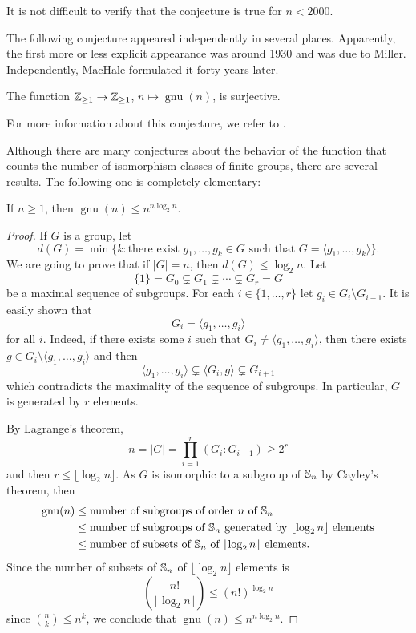 It is not difficult to verify that the conjecture is true for $n<2000$.

The following conjecture appeared independently in several places. Apparently, the first more or less explicit appearance was around 1930 and was due to Miller. Independently, MacHale formulated it forty years later.

\begin{conjecture}
The function $\mathbb{Z}_{\geq1}\to\mathbb{Z}_{\geq1}$, 
$n\mapsto\operatorname{gnu}(n)$, is surjective.
\end{conjecture}

For more information about this conjecture, we refer to \cite[\S21.6]{MR2382539}.

Although there are many conjectures about the behavior of the function that counts the number of isomorphism classes of finite groups, there are several results. The following one is completely elementary:

\begin{theorem}
If $n\geq1$, then $\operatorname{gnu}(n)\leq n^{n\log_2 n}$.
\end{theorem}

\begin{proof}
If $G$ is a group, let
\[
d(G)=\min\{k:\text{there exist }g_1,\dots,g_k\in G\text{ such that }G=\langle g_1,\dots,g_k\rangle\}.
\]
We are going to prove that if $|G|=n$, then $d(G)\leq\log_2 n$. Let
\[
\{1\}=G_0\subsetneq G_1\subsetneq\cdots\subsetneq G_r=G
\]
be a maximal sequence of subgroups. For each $i\in\{1,\dots,r\}$ let
$g_i\in G_i\setminus G_{i-1}$. It is easily shown
that
\[
G_i=\langle g_1,\dots,g_i\rangle
\]
for all $i$. 
Indeed, if there exists some $i$ such that $G_i\ne\langle g_1,\dots,g_i\rangle$, then
there exists $g\in G_i\setminus\langle g_1,\dots,g_i\rangle$ and then
\[
\langle g_1,\dots,g_i\rangle\subsetneq \langle G_i,g\rangle\subsetneq G_{i+1}
\]
which contradicts the maximality of the sequence of subgroups. In particular, $G$ is generated 
by $r$ elements.

By Lagrange's theorem, 
\[
n=|G|=\prod_{i=1}^r(G_i:G_{i-1})\geq 2^r
\]
and then $r\leq\lfloor \log_2 n\rfloor$. 
As $G$ is isomorphic to a 
subgroup of $\mathbb{S}_n$ by Cayley's theorem, then 
\begin{align*}
\operatorname{gnu}(n)
&\leq\text{number of subgroups of order $n$ of $\mathbb{S}_n$}\\
&\leq\text{number of subgroups of $\mathbb{S}_n$ generated by $\lfloor\log_2n\rfloor$ elements}\\
&\leq\text{number of subsets of $\mathbb{S}_n$ of $\lfloor\log_2n\rfloor$ elements}.
\end{align*}
Since the number of subsets of $\mathbb{S}_n$ of $\lfloor\log_2n\rfloor$ elements
is
\[
\binom{n!}{\lfloor\log_2n\rfloor}\leq(n!)^{\log_2n}
\]
since $\binom{n}{k}\leq n^k$, we conclude that $\operatorname{gnu}(n)\leq n^{n\log_2n}$.
\end{proof}

